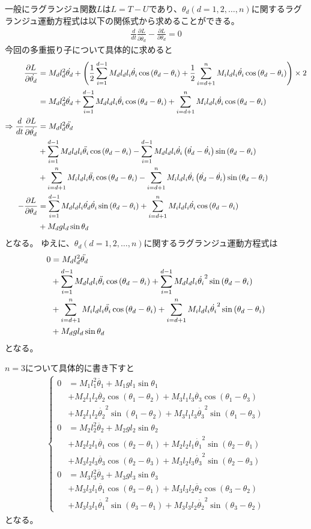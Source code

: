 \documentclass{jsarticle}
\newcommand{\eqa}[1]{\begin{align}#1\end{align}}
\newcommand{\so}{\Rightarrow}
\newcommand{\cost}[2]{\cos\left(\theta_{#1}-\theta_{#2}\right)}
\newcommand{\sint}[2]{\sin\left(\theta_{#1}-\theta_{#2}\right)}
\newcommand{\dott}[1]{\dot{\theta_{#1}}}
\newcommand{\ddott}[1]{\ddot{\theta_{#1}}}
\begin{document}
一般にラグランジュ関数$L$は$L = T - U$であり、$\theta_d(d=1,2,\dots,n)$に関するラグランジュ運動方程式は以下の関係式から求めることができる。
\eqa{
	\frac{d}{dt} \frac{\partial L}{\partial \dott{d}} - \frac{\partial L}{\partial \theta_d} = 0
}
今回の多重振り子について具体的に求めると
\eqa{
	\frac{\partial L}{\partial \dott{d}} &=
		M_d l_d^2 \dott{d}
		+ \left(\frac{1}{2}\sum_{i=1}^{d-1} M_d l_d l_i \dott{i} \cost{d}{i} + \frac{1}{2}\sum_{i=d+1}^n M_i l_d l_i \dott{i} \cost{d}{i} \right) \times 2 \notag\\
		&= M_d l_d^2 \dott{d} + \sum_{i=1}^{d-1} M_d l_d l_i \dott{i} \cost{d}{i} +\sum_{i=d+1}^n M_i l_d l_i \dott{i} \cost{d}{i} \\
	\so \frac{d}{dt} \frac{\partial L}{\partial \dott{d}} &=
		M_d l_d^2 \ddott{d} \notag\\
		&+ \sum_{i=1}^{d-1} M_d l_d l_i \ddott{i} \cost{d}{i}
			- \sum_{i=1}^{d-1} M_d l_d l_i \dott{i} \left( \dott{d} - \dott{i} \right) \sint{d}{i} \notag\\
		&+ \sum_{i=d+1}^n M_i l_d l_i \ddott{i} \cost{d}{i}
			- \sum_{i=d+1}^n M_i l_d l_i \dott{i} \left( \dott{d} - \dott{i} \right) \sint{d}{i} \notag\\
	- \frac{\partial L}{\partial \theta_d} &=
		\sum_{i=1}^{d-1} M_d l_d l_i \dott{d} \dott{i} \sint{d}{i} + \sum_{i=d+1}^n M_i l_d l_i \dott{i} \cost{d}{i} \notag\\
		&+ M_d g l_d \sin\theta_d
}
となる。
ゆえに、$\theta_d(d=1,2,\dots,n)$に関するラグランジュ運動方程式は
\eqa{
	0 &= M_d l_d^2 \ddott{d} \notag\\
		&+ \sum_{i=1}^{d-1} M_d l_d l_i \ddott{i} \cost{d}{i}
			+ \sum_{i=1}^{d-1} M_d l_d l_i \dott{i}^2 \sint{d}{i} \notag\\
		&+ \sum_{i=d+1}^n M_i l_d l_i \ddott{i} \cost{d}{i}
			+ \sum_{i=d+1}^n M_i l_d l_i \dott{i}^2 \sint{d}{i} \notag\\
		&+ M_d g l_d \sin\theta_d
		\label{2Dラグランジュ運動方程式}
}
となる。

$n=3$について具体的に書き下すと
\eqa{
	\begin{cases}
		0 &= M_1 l_1^2 \ddott{1} + M_1 g l_1 \sin\theta_1 \\
			&+ M_2 l_1 l_2 \ddott{2} \cost{1}{2} + M_3 l_1 l_3 \ddott{3} \cost{1}{3} \\
			&+ M_2 l_1 l_2 \dott{2}^2 \sint{1}{2} + M_3 l_1 l_3 \dott{3}^2 \sint{1}{3} \\
		0 &= M_2 l_2^2 \ddott{2}  + M_2 g l_2 \sin\theta_2 \\
			&+ M_2 l_2 l_1 \ddott{1} \cost{2}{1} + M_2 l_2 l_1 \dott{1}^2 \sint{2}{1} \\
			&+ M_3 l_2 l_3 \ddott{3} \cost{2}{3} + M_3 l_2 l_3 \dott{3}^2 \sint{2}{3} \\
		0 &= M_3 l_3^2 \ddott{3}  + M_3 g l_3 \sin\theta_3 \\
			&+ M_3 l_3 l_1 \ddott{1} \cost{3}{1} + M_3 l_3 l_2 \ddott{2} \cost{3}{2} \\
			&+ M_3 l_3 l_1 \dott{1}^2 \sint{3}{1} + M_3 l_3 l_2 \dott{2}^2 \sint{3}{2}
	\end{cases}
}
となる。
\end{document}
